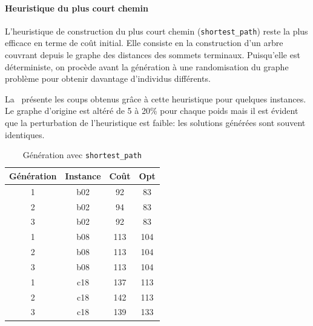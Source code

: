 \documentclass[10pt]{article}
\begin{document}
		\paragraph{Heuristique du plus court chemin}{
			L'heuristique de construction du plus court chemin (\texttt{shortest\_path}) reste la plus efficace en terme de coût initial. Elle consiste en la construction d'un arbre couvrant depuis le graphe des distances des sommets terminaux. Puisqu'elle est déterministe, on procède avant la génération à une randomisation du graphe problème pour obtenir davantage d'individus différents.
		
		La~ présente les coups obtenus grâce à cette heuristique pour quelques instances. Le graphe d'origine est altéré de 5 à 20\% pour chaque poids mais il est évident que la perturbation de l'heuristique est faible: les solutions générées sont souvent identiques.
		
		\begin{table}[h!]
				\centering
				\begin{tabular}{|c|c|c|c|}
					\hline
					\textbf{Génération} & \textbf{Instance} & \textbf{Coût} & \textbf{Opt} \\
					\hline
					1 & b02  & 92 & 83 \\
					2 & b02  & 94 & 83 \\
					3 & b02  & 92 & 83 \\
					1 & b08  & 113 & 104 \\
					2 & b08  & 113 & 104 \\
					3 & b08  & 113 & 104 \\
					1 & c18  & 137 & 113 \\
					2 & c18  & 142 & 113 \\
					3 & c18  & 139 & 133 \\
					\hline
				\end{tabular}
				\caption{Génération avec \texttt{shortest\_path}}
				\label{tab-spinit}
			\end{table}
		}
\end{document}
